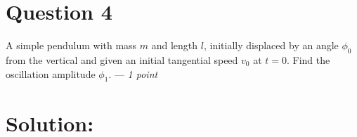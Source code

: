 \section*{Question 4}
A simple pendulum with mass $m$ and length $l$, initially displaced by an angle $\phi_0$ from the vertical and given an initial tangential speed $v_0$ at $t = 0$. Find the oscillation amplitude $\phi_1$. --- \textit{1 point}

 \section*{Solution:}
